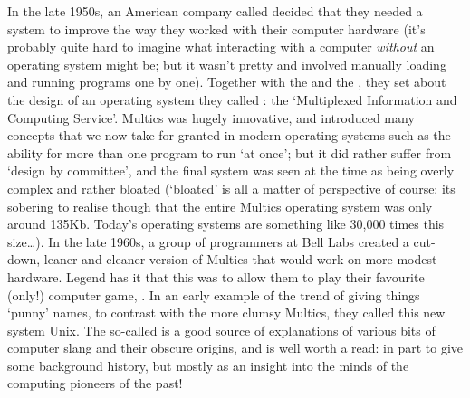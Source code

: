 In the late 1950s, an American company called  decided that they needed a system to improve the way they worked with their computer hardware (it's probably quite hard to imagine what interacting with a computer \emph{without} an operating system might be; but it wasn't pretty and involved manually loading and running programs one by one). Together with the  and the , they set about the design of an operating system they called : the `Multiplexed Information and Computing Service'. Multics was hugely innovative, and introduced many concepts that we now take for granted in modern operating systems such as the ability for more than one program to run `at once'; but it did rather suffer from `design by committee', and the final system was seen at the time as being overly complex and rather bloated (`bloated' is all a matter of perspective of course: its sobering to realise though that the entire Multics operating system was only around 135Kb. Today's operating systems are something like 30,000 times this size\ldots). In the late 1960s, a group of programmers at Bell Labs created a cut-down, leaner and cleaner version of Multics that would work on more modest hardware. Legend has it that this was to allow them to play their favourite (only!) computer game, . In an early example of the trend of giving things `punny' names, to contrast with the more clumsy Multics, they called this new system Unix. The so-called  is a good source of explanations of various bits of computer slang and their obscure origins, and is well worth a read: in part to give some background history, but mostly as an insight into the minds of the computing pioneers of the past!


